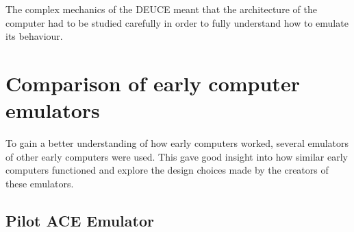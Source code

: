 \documentclass{l4proj}
\begin{document}
The complex mechanics of the DEUCE meant that the architecture of the computer had to be studied carefully in order to fully understand how to emulate its behaviour.

\section{Comparison of early computer emulators}
To gain a better understanding of how early computers worked, several emulators of other early computers were used. This gave good insight into how similar early computers functioned and explore the design choices made by the creators of these emulators.

\subsection{Pilot ACE Emulator} 
\end{document}
